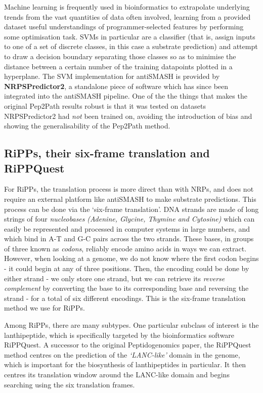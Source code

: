 \documentclass{l4proj}
\newcommand{\cit}[1]{\citep{#1}}
\begin{document}
Machine learning is frequently used in bioinformatics to extrapolate underlying trends from the vast quantities of data often involved, learning from a provided dataset useful understandings of programmer-selected features by performing some optimisation task. SVMs in particular are a classifier (that is, assign inputs to one of a set of discrete classes, in this case a substrate prediction) and attempt to draw a decision boundary separating those classes so as to minimise the distance between a certain number of the training datapoints plotted in a hyperplane. The SVM implementation for antiSMASH is provided by \textbf{NRPSPredictor2}, \cit{nrps2} a standalone piece of software which has since been integrated into the antiSMASH pipeline. One of the the things that makes the original Pep2Path results robust is that it was tested on datasets NRPSPredictor2 had \textit{not} been trained on, avoiding the introduction of bias and showing the generalisability of the Pep2Path method.

\subsection{RiPPs, their six-frame translation and RiPPQuest} \label{ripps}

For RiPPs, the translation process is more direct than with NRPs, and does not require an external platform like antiSMASH to make substrate predictions. This process can be done via the `six-frame translation'. DNA strands are made of long strings of four \textit{nucleobases} \textit{(Adenine, Glycine, Thymine and Cytosine)} which can easily be represented and processed in computer systems in large numbers, and which bind in A-T and G-C pairs across the two strands. These bases, in groups of three known as \textit{codons}, reliably encode amino acids in ways we can extract. However, when looking at a genome, we do not know where the first codon begins - it could begin at any of three positions. Then, the encoding could be done by either strand - we only store one strand, but we can retrieve its \textit{reverse complement} by converting the base to its corresponding base and reversing the strand - for a total of six different encodings. This is the six-frame translation method we use for RiPPs.

Among RiPPs, there are many subtypes. One particular subclass of interest is the lanthipeptide, which is specifically targeted by the bioinformatics software RiPPQuest. \cit{rippq} A successor to the original Peptidogenomics paper, the RiPPQuest method centres on the prediction of the \textit{`LANC-like'} domain in the genome, which is important for the biosynthesis of lanthipeptides in particular. It then centres its translation window around the LANC-like domain and begins searching using the six translation frames. 
\end{document}
